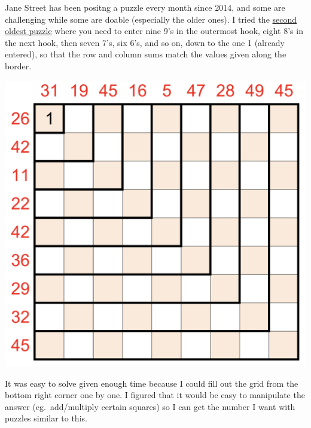 \documentclass[12pt, oneside]{article}
\begin{document}
Jane Street has been positng a puzzle every month since 2014, and some are challenging while some are doable (especially the older ones). I tried the \href{https://www.janestreet.com/puzzles/hooks-index/}{second oldest puzzle} where you need to enter nine 9’s in the outermost hook, eight 8’s in the next hook, then seven 7’s, six 6’s, and so on, down to the one 1 (already entered), so that the row and column sums match the values given along the border.\\
\begin{center}
\includegraphics[scale=0.4]{puzzle1}
\end{center}
It was easy to solve given enough time because I could fill out the grid from the bottom right corner one by one. I figured that it would be easy to manipulate the answer (eg.\ add/multiply certain squares) so I can get the number I want with  puzzles similar to this.
\end{document}

